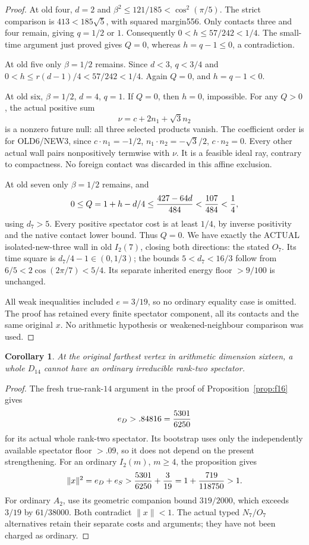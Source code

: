 \documentclass[11pt]{article}
\newtheorem{corollary}[theorem]{Corollary}
\begin{document}
\begin{proof}
At old four, \(d=2\) and
\(\beta^2\le121/185<\cos^2(\pi/5)\).
The strict comparison is \(413<185\sqrt5\), with squared
margin556.  Only contacts three and four remain, giving
\(q=1/2\) or \(1\).
Consequently \(0<h\le57/242<1/4\).
The small-time argument just proved gives \(Q=0\), whereas
\(h=q-1\le0\), a contradiction.

At old five only \(\beta=1/2\) remains.
Since \(d<3\), \(q<3/4\) and
\(0<h\le r(d-1)/4<57/242<1/4\).
Again \(Q=0\), and \(h=q-1<0\).

At old six, \(\beta=1/2\), \(d=4\), \(q=1\).
If \(Q=0\), then \(h=0\), impossible.
For any \(Q>0\), the actual positive sum
\[
                          \nu=c+2n_1+\sqrt3n_2
\]
is a nonzero future null: all three selected products vanish.
The coefficient order is for OLD6/NEW3, since
\(c\cdot n_1=-1/2\), \(n_1\cdot n_2=-\sqrt3/2\),
\(c\cdot n_2=0\).
Every other actual wall pairs nonpositively termwise with \(\nu\).
It is a feasible ideal ray, contrary to compactness.
No foreign contact was discarded in this affine exclusion.

At old seven only \(\beta=1/2\) remains, and
\[
 0\le Q=1+h-d/4
 \le{427-64d\over484}<{107\over484}<{1\over4},
\]
using \(d_7>5\).
Every positive spectator cost is at least \(1/4\), by inverse
positivity and the native contact lower bound.  Thus \(Q=0\).
We have exactly the ACTUAL isolated-new-three wall in old
\(I_2(7)\), closing both directions: the stated \(O_7\).
Its time square is \(d_7/4-1\in(0,1/3)\);
the bounds \(5<d_7<16/3\) follow from
\(6/5<2\cos(2\pi/7)<5/4\).
Its separate inherited energy floor \(>9/100\) is unchanged.

All weak inequalities included \(e=3/19\), so no ordinary equality
case is omitted.  The proof has retained every finite spectator
component, all its contacts and the same original \(x\).
No arithmetic hypothesis or weakened-neighbour comparison was used.
\end{proof}

\begin{corollary}\label{cor:D14ordinarydihedral}
At the original farthest vertex in arithmetic dimension sixteen,
a whole \(D_{14}\) cannot have an ordinary irreducible
rank-two spectator.
\end{corollary}
\begin{proof}
The fresh true-rank-\(14\) argument in the proof of
Proposition~\ref{prop:f16} gives
\[
                         e_D>.84816={5301\over6250}
\]
for its actual whole rank-two spectator.
Its bootstrap uses only the independently available spectator
floor \(>.09\), so it does not depend on the present strengthening.
For an ordinary \(I_2(m)\), \(m\ge4\), the proposition gives
\[
 \|x\|^2=e_D+e_S>
 {5301\over6250}+{3\over19}
 =1+{719\over118750}>1 .
\]
For ordinary \(A_2\), use its geometric companion bound
\(319/2000\), which exceeds \(3/19\) by \(61/38000\).
Both contradict \(\|x\|<1\).
The actual typed \(N_7/O_7\) alternatives retain their separate
costs and arguments; they have not been charged as ordinary.
\end{proof}
\end{document}
